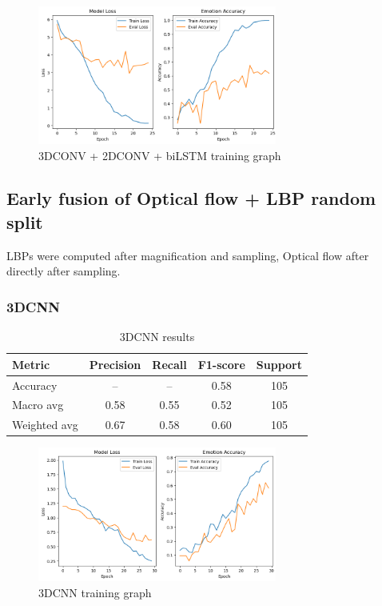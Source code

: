 \documentclass{article}
\begin{document}
\begin{figure}[H]
  \begin{center}
    \includegraphics*[width=0.7\textwidth]{Figures/Picture10.png}
  \end{center}
  \caption{3DCONV + 2DCONV + biLSTM training graph}
  \label{fig:fig10}
\end{figure}

\subsection{Early fusion of Optical flow + LBP random split}
LBPs were computed after magnification and sampling, Optical flow after directly after sampling.

\subsubsection{3DCNN}
\begin{table}[H]
\centering
\caption{3DCNN results}
\begin{tabular}{|l|c|c|c|c|}
\hline
\textbf{Metric} & \textbf{Precision} & \textbf{Recall} & \textbf{F1-score} & \textbf{Support} \\
\hline
Accuracy       & --   & --   & 0.58 & 105 \\
Macro avg      & 0.58 & 0.55 & 0.52 & 105 \\
Weighted avg   & 0.67 & 0.58 & 0.60 & 105 \\
\hline
\end{tabular}%
\label{tab:table7}
\end{table}

\begin{figure}[H]
  \begin{center}
    \includegraphics*[width=0.7\textwidth]{Figures/Picture11.png}
  \end{center}
  \caption{3DCNN training graph}
  \label{fig:fig11}
\end{figure}
\end{document}
